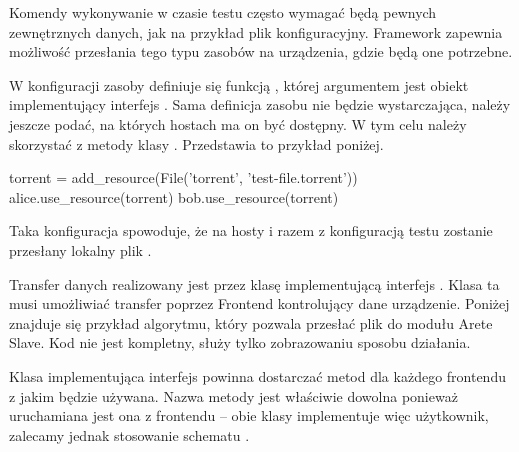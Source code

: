 \documentclass[00-praca-magisterska.tex]{subfiles}
\begin{document}
Komendy wykonywanie w czasie testu często wymagać będą pewnych zewnętrznych
danych, jak na przykład plik konfiguracyjny. Framework zapewnia możliwość
przesłania tego typu zasobów na urządzenia, gdzie będą one potrzebne.

W konfiguracji zasoby definiuje się funkcją , której
argumentem jest obiekt implementujący interfejs . Sama definicja
zasobu nie będzie wystarczająca, należy jeszcze podać, na których hostach ma on
być dostępny. W tym celu należy skorzystać z metody  klasy
. Przedstawia to przykład poniżej.

\begin{pythoncode}
  torrent = add_resource(File('torrent', 'test-file.torrent'))
  alice.use_resource(torrent)
  bob.use_resource(torrent)
\end{pythoncode}

Taka konfiguracja spowoduje, że na hosty  i  razem z
konfiguracją testu zostanie przesłany lokalny plik .

Transfer danych realizowany jest przez klasę implementującą interfejs
. Klasa ta musi umożliwiać transfer poprzez Frontend kontrolujący
dane urządzenie. Poniżej znajduje się przykład algorytmu, który pozwala przesłać
plik do modułu Arete Slave. Kod nie jest kompletny, służy tylko zobrazowaniu
sposobu działania.


Klasa implementująca interfejs  powinna dostarczać metod
 dla każdego frontendu z jakim będzie używana. Nazwa
metody jest właściwie dowolna ponieważ uruchamiana jest ona z frontendu -- obie
klasy implementuje więc użytkownik, zalecamy jednak stosowanie schematu
.
\end{document}
